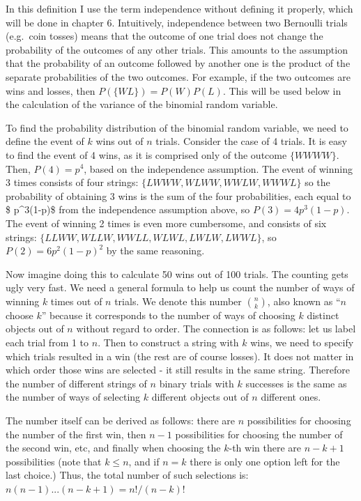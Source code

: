 \documentclass[
  letterpaper,
  DIV=11,
  numbers=noendperiod]{scrreprt}
\begin{document}
In this definition I use the term independence without defining it
properly, which will be done in chapter 6. Intuitively, independence
between two Bernoulli trials (e.g.~coin tosses) means that the outcome
of one trial does not change the probability of the outcomes of any
other trials. This amounts to the assumption that the probability of an
outcome followed by another one is the product of the separate
probabilities of the two outcomes. For example, if the two outcomes are
wins and losses, then \(P(\{WL\}) = P(W)P(L)\). This will be used below
in the calculation of the variance of the binomial random variable.

To find the probability distribution of the binomial random variable, we
need to define the event of \(k\) wins out of \(n\) trials. Consider the
case of 4 trials. It is easy to find the event of 4 wins, as it is
comprised only of the outcome \(\{WWWW\}\). Then, \(P(4) = p^4\), based
on the independence assumption. The event of winning 3 times consists of
four strings: \(\{LWWW, WLWW, WWLW, WWWL\}\) so the probability of
obtaining 3 wins is the sum of the four probabilities, each equal to \$
p\^{}3(1-p)\$ from the independence assumption above, so
\(P(3) = 4p^3(1-p)\). The event of winning 2 times is even more
cumbersome, and consists of six strings:
\(\{ LLWW, WLLW, WWLL, WLWL, LWLW, LWWL\}\), so \(P(2) = 6p^2(1-p)^2\)
by the same reasoning.

Now imagine doing this to calculate 50 wins out of 100 trials. The
counting gets ugly very fast. We need a general formula to help us count
the number of ways of winning \(k\) times out of \(n\) trials. We denote
this number \(\binom{n}{k}\), also known as ``\(n\) choose \(k\)''
because it corresponds to the number of ways of choosing \(k\) distinct
objects out of \(n\) without regard to order. The connection is as
follows: let us label each trial from 1 to \(n\). Then to construct a
string with \(k\) wins, we need to specify which trials resulted in a
win (the rest are of course losses). It does not matter in which order
those wins are selected - it still results in the same string. Therefore
the number of different strings of \(n\) binary trials with \(k\)
successes is the same as the number of ways of selecting \(k\) different
objects out of \(n\) different ones.

The number itself can be derived as follows: there are \(n\)
possibilities for choosing the number of the first win, then \(n-1\)
possibilities for choosing the number of the second win, etc, and
finally when choosing the \(k\)-th win there are \(n-k+1\) possibilities
(note that \(k \leq n\), and if \(n=k\) there is only one option left
for the last choice.) Thus, the total number of such selections is:
\(n(n-1)...(n-k+1) = n!/(n-k)!\)
\end{document}
